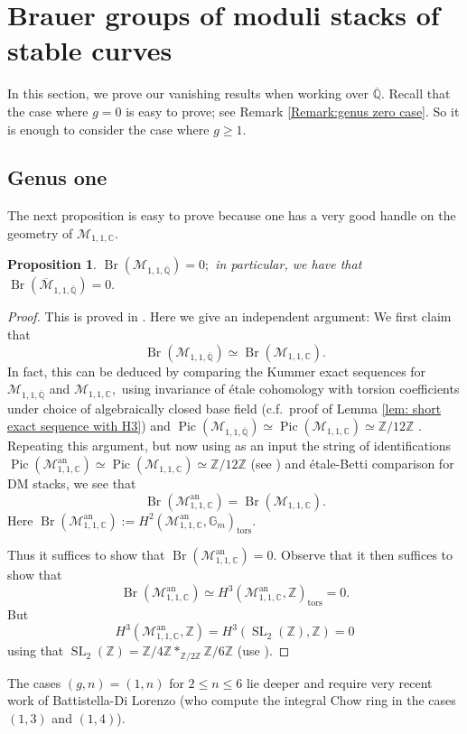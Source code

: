 \documentclass{amsart}
\newtheorem{prop}{Proposition}[section]
\theoremstyle{definition}
\theoremstyle{remark}
\DeclareMathOperator{\SL}{SL}
\DeclareMathOperator{\Br}{Br}
\DeclareMathOperator{\tors}{tors}
\DeclareMathOperator{\Pic}{Pic}
\DeclareMathOperator{\an}{an}
\newcommand{\Q}{\mathbb{Q}}
\newcommand{\ZZ}{\mathbb Z}
\begin{document}
\section{Brauer groups of moduli stacks of stable curves}\label{Section: Brauer groups of moduli spaces of stable curves}


In this section,
we prove our vanishing results when working over $\overline{\Q}.$
Recall that the case where $g=0$ is easy to prove; see Remark \ref{Remark:genus zero case}.
So it is enough to consider the case where $g \geq 1$.


\subsection{Genus one}

The next proposition is easy to prove because one has a very good handle on the geometry of $\mathcal{M}_{1,1,\mathbb{C}}$.

\begin{prop}\label{Prop: Vanishing (1,1) bar Q}
$\Br(\mathcal{M}_{1,1,\overline{\Q}})=0;$ in particular, we have that
$\Br(\overline{\mathcal{M}}_{1,1,\overline{\Q}})=0.$
\end{prop}
\begin{proof}
This is proved in \cite[Theorem 1.1 (1)]{AntieauMeierBrauerElliptic}.
Here we give an independent argument:
We first claim that 
\[
\Br(\mathcal{M}_{1,1,\overline{\Q}})\simeq\Br(\mathcal{M}_{1,1,\mathbb{C}}).
\]
In fact, this can be deduced by comparing the Kummer exact sequences for $\mathcal{M}_{1,1,\overline{\Q}}$ and $\mathcal{M}_{1,1,\mathbb{C}},$ using invariance of étale cohomology with torsion coefficients under choice of algebraically closed base field (c.f.\ proof of Lemma \ref{lem: short exact sequence with H3}) and $\Pic(\mathcal{M}_{1,1,\overline{\Q}})\simeq \Pic(\mathcal{M}_{1,1,\mathbb{C}})\simeq \mathbb{Z}/12\mathbb{Z}$ \cite{FultonOlssonPicM11}.
Repeating this argument, but now using as an input the string of identifications
$\Pic(\mathcal{M}^{\an}_{1,1,\mathbb{C}})\simeq \Pic(\mathcal{M}_{1,1,\mathbb{C}})\simeq \mathbb{Z}/12\ZZ$ (see \cite{ArbarelloCornalbaPicCurves})
and étale-Betti comparison for DM stacks, we see that
$$
\Br(\mathcal{M}^{\an}_{1,1,\mathbb{C}})=\Br(\mathcal{M}_{1,1,\mathbb{C}}).
$$
Here
$\Br(\mathcal{M}^{\an}_{1,1,\mathbb{C}}):=H^2(\mathcal{M}^{\an}_{1,1,\mathbb{C}}, \mathbb{G}_m)_{\tors}$.

Thus it suffices to show that $\Br(\mathcal{M}^{\an}_{1,1,\mathbb{C}})=0$.
Observe that it then suffices to show that
$$
\Br(\mathcal{M}^{\an}_{1,1,\mathbb{C}})\simeq H^{3}(\mathcal{M}^{\an}_{1,1,\mathbb{C}},\mathbb{Z})_{\tors}=0.
$$
But
$$
H^{3}(\mathcal{M}^{\an}_{1,1,\mathbb{C}},\mathbb{Z})=H^{3}(\SL_{2}(\ZZ),\ZZ)=0
$$
using that $\SL_{2}(\ZZ)=\ZZ/4\ZZ \ast_{\ZZ/2\ZZ} \ZZ/6\ZZ$ (use \cite[Corollary 7.7]{BrownCohoGroups}).
\end{proof}
The cases $(g,n)=(1,n)$ for $2\leq n \leq 6$ lie deeper and require very recent work of Battistella-Di Lorenzo \cite{battistella2024wallcrossingintegralchowrings} (who compute the integral Chow ring in the cases $(1,3)$ and $(1,4)$).
\end{document}
